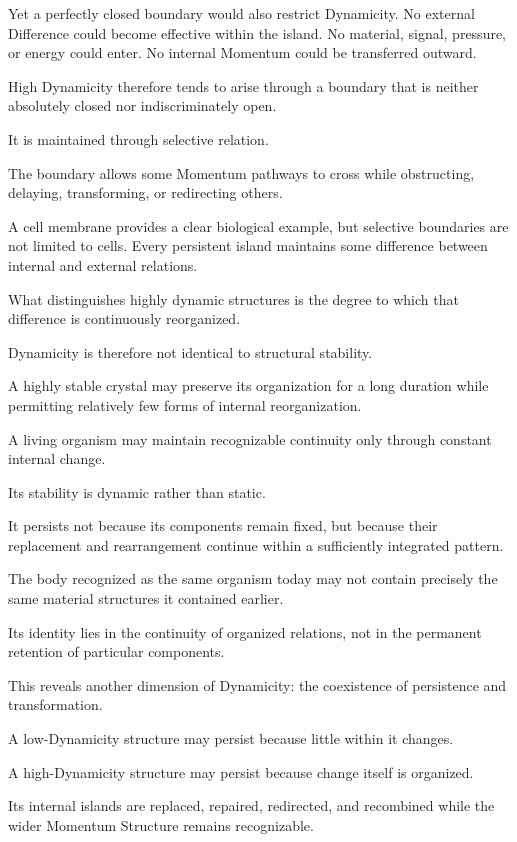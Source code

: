 Yet a perfectly closed boundary would also restrict Dynamicity. No external Difference could become effective within the island. No material, signal, pressure, or energy could enter. No internal Momentum could be transferred outward.

High Dynamicity therefore tends to arise through a boundary that is neither absolutely closed nor indiscriminately open.

It is maintained through selective relation.

The boundary allows some Momentum pathways to cross while obstructing, delaying, transforming, or redirecting others.

A cell membrane provides a clear biological example, but selective boundaries are not limited to cells. Every persistent island maintains some difference between internal and external relations.

What distinguishes highly dynamic structures is the degree to which that difference is continuously reorganized.

Dynamicity is therefore not identical to structural stability.

A highly stable crystal may preserve its organization for a long duration while permitting relatively few forms of internal reorganization.

A living organism may maintain recognizable continuity only through constant internal change.

Its stability is dynamic rather than static.

It persists not because its components remain fixed, but because their replacement and rearrangement continue within a sufficiently integrated pattern.

The body recognized as the same organism today may not contain precisely the same material structures it contained earlier.

Its identity lies in the continuity of organized relations, not in the permanent retention of particular components.

This reveals another dimension of Dynamicity: the coexistence of persistence and transformation.

A low-Dynamicity structure may persist because little within it changes.

A high-Dynamicity structure may persist because change itself is organized.

Its internal islands are replaced, repaired, redirected, and recombined while the wider Momentum Structure remains recognizable.

